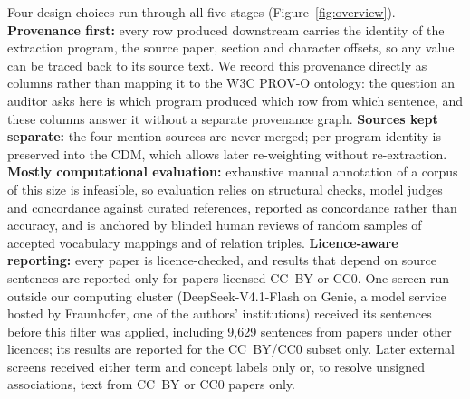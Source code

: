 \documentclass[referee,lineno,pdflatex,sn-vancouver-num]{sn-jnl}
\theoremstyle{thmstyleone}%
\theoremstyle{thmstyletwo}%
\theoremstyle{thmstylethree}%
\begin{document}
Four design choices run through all five stages
(Figure~\ref{fig:overview}).
\textbf{Provenance first:} every row produced downstream carries the
identity of the extraction program, the source paper, section and
character offsets, so any value can be traced back to its source
text. We record this provenance directly as columns rather than mapping it
to the W3C PROV-O ontology: the question an auditor asks here is which
program produced which row from which sentence, and these columns answer it
without a separate provenance graph. \textbf{Sources kept separate:} the four mention sources are
never merged; per-program identity is preserved into the CDM, which
allows later re-weighting without re-extraction.
\textbf{Mostly computational evaluation:} exhaustive manual annotation
of a corpus of this size is infeasible, so evaluation relies on
structural checks, model judges and concordance against curated
references, reported as concordance rather than accuracy, and is
anchored by blinded human reviews of random samples of accepted
vocabulary mappings and of relation triples.
\textbf{Licence-aware reporting:} every paper is licence-checked, and
results that depend on source sentences are reported only for papers
licensed CC~BY or CC0. One screen run outside our computing cluster (DeepSeek-V4.1-Flash on Genie,
a model service hosted by Fraunhofer, one of the authors' institutions)
received its sentences
before this filter was applied, including 9,629 sentences from papers
under other licences; its results are reported for the CC~BY/CC0 subset
only. Later external screens received either term and concept labels only
or, to resolve unsigned associations, text from CC~BY or CC0 papers only.
\end{document}
